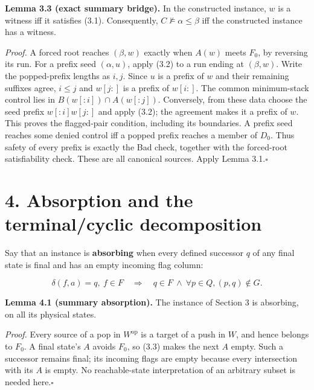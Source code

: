 \documentclass[
  11pt,
  a4paper,
]{article}
\begin{document}

\textbf{Lemma 3.3 (exact summary bridge).} In the constructed instance,
\(w\) is a witness iff it satisfies (3.1). Consequently,
\(C\not\models\alpha\le\beta\) iff the constructed instance has a
witness.

\emph{Proof.} A forced root reaches \((\beta,w)\) exactly when \(A(w)\)
meets \(F_0\), by reversing its run. For a prefix seed \((\alpha,u)\),
apply (3.2) to a run ending at \((\beta,w)\). Write the popped-prefix
lengths as \(i,j\). Since \(u\) is a prefix of \(w\) and their remaining
suffixes agree, \(i\le j\) and \(w[j:]\) is a prefix of \(w[i:]\). The
common minimum-stack control lies in \(B(w[:i])\cap A(w[:j])\).
Conversely, from these data choose the seed prefix \(w[:i]w[j:]\) and
apply (3.2); the agreement makes it a prefix of \(w\). This proves the
flagged-pair condition, including its boundaries. A prefix seed reaches
some denied control iff a popped prefix reaches a member of \(D_0\).
Thus safety of every prefix is exactly the Bad check, together with the
forced-root satisfiability check. These are all canonical sources. Apply
Lemma 3.1.\nobreak\hspace{.5em}\(\square\)


\section{4. Absorption and the terminal/cyclic
decomposition}\label{absorption-and-the-terminalcyclic-decomposition}

Say that an instance is \textbf{absorbing} when every defined successor
\(q\) of any final state is final and has an empty incoming flag column:

\[\delta(f,a)=q,\ f\in F\quad\Longrightarrow\quad
q\in F\ \land\ \forall p\in Q, (p,q)\notin G.\tag{4.1}\]


\textbf{Lemma 4.1 (summary absorption).} The instance of Section 3 is
absorbing, on all its physical states.

\emph{Proof.} Every source of a pop in \(W^{\mathrm{op}}\) is a target
of a push in \(W\), and hence belongs to \(F_0\). A final state's \(A\)
avoids \(F_0\), so (3.3) makes the next \(A\) empty. Such a successor
remains final; its incoming flags are empty because every intersection
with its \(A\) is empty. No reachable-state interpretation of an
arbitrary subset is needed here.\nobreak\hspace{.5em}\(\square\)
\end{document}
